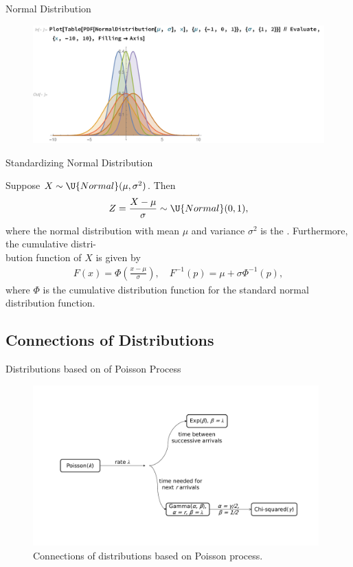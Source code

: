 \begin{frame}{Normal Distribution}

\begin{figure}[htbp]
	\centering
	\includegraphics[width=\linewidth]{./images/rc2fig5.pdf}
\end{figure}

\end{frame}

\begin{frame}{Standardizing Normal Distribution}

\justifying
Suppose $X\sim \U{Normal}(\mu, \sigma^2)$. Then 
\begin{align*}
Z = \frac{X-\mu}{\sigma} \sim \U{Normal}(0, 1),
\end{align*}
where the normal distribution with mean $\mu$ and variance $\sigma^2$ is the . Furthermore, the cumulative distri-\\bution function of $X$ is given by
\begin{align*}
F(x) = \Phi\left(\frac{x-\mu}{\sigma} \right), \quad F^{-1}(p) = \mu + \sigma \Phi^{-1}(p),
\end{align*}
where $\Phi$ is the cumulative distribution function for the standard normal distribution function.

\end{frame}


\subsection{Connections of Distributions}

\begin{frame}{Distributions based on of Poisson Process}

\begin{figure}[htbp]
	\centering
	\includegraphics[width=11cm]{./images/rc2fig6.pdf}
	\caption{Connections of distributions based on Poisson process.}
\end{figure}

\end{frame}


